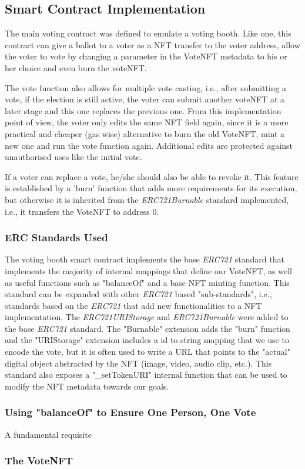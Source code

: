 \documentclass[../main.tex]{subfiles}
\begin{document}
\subsection{Smart Contract Implementation}
The main voting contract was defined to emulate a voting booth. Like one, this contract can give a ballot to a voter as a NFT transfer to the voter address, allow the voter to vote by changing a parameter in the VoteNFT metadata to his or her choice and even burn the voteNFT.
\par
The vote function also allows for multiple vote casting, i.e., after submitting a vote, if the election is still active, the voter can submit another voteNFT at a later stage and this one replaces the previous one. From this implementation point of view, the voter only edits the same NFT field again, since it is a more practical and cheaper (gas wise) alternative to burn the old VoteNFT, mint a new one and run the vote function again. Additional edits are protected against unauthorised uses like the initial vote.
\par
If a voter can replace a vote, he/she should also be able to revoke it. This feature is established by a 'burn' function that adds more requirements for its execution, but otherwise it is inherited from the \textit{ERC721Burnable} standard implemented, i.e., it transfers the VoteNFT to address 0.

\subsubsection{ERC Standards Used}
The voting booth smart contract implements the base \textit{ERC721} standard that implements the majority of internal mappings that define our VoteNFT, as well as useful functions such as "balanceOf" and a base NFT minting function. This standard can be expanded with other \textit{ERC721} based "sub-standards", i.e., standards based on the \textit{ERC721} that add new functionalities to a NFT implementation. The \textit{ERC721URIStorage} and \textit{ERC721Burnable} were added to the base \textit{ERC721} standard. The "Burnable" extension adds the "burn" function and the "URIStorage" extension includes a id to string mapping that we use to encode the vote, but it is often used to write a URL that points to the "actual" digital object abstracted by the NFT (image, video, audio clip, etc.). This standard also exposes a "\_setTokenURI" internal function that can be used to modify the NFT metadata towards our goals.



\subsubsection{Using "balanceOf" to Ensure One Person, One Vote}
A fundamental requisite

\subsubsection{The VoteNFT}

\end{document}
